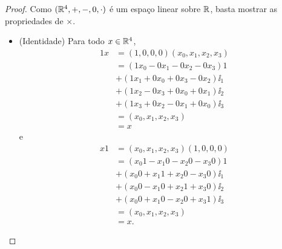 \begin{proof}
Como $(\mathbb{R}^4,+,-,0,\cdot)$ é um espaço linear sobre $\mathbb{R}$, basta mostrar as propriedades de $\times$.
\begin{itemize}
	\item (Identidade) Para todo $x \in \mathbb{R}^4$,
		\begin{align*}
		1x &= (1,0,0,0)(x_0,x_1,x_2,x_3) \\
			&= (1 x_0 - 0 x_1 - 0 x_2 - 0 x_3)1 \\
			&+ (1 x_1 + 0 x_0 + 0 x_3 - 0 x_2)\ii_1 \\
			&+ (1 x_2 - 0 x_3 + 0 x_0 + 0 x_1)\ii_2 \\
			&+ (1 x_3 + 0 x_2 - 0 x_1 + 0 x_0)\ii_3 \\
			&= (x_0,x_1,x_2,x_3) \\
			&= x
		\end{align*}
	e
		\begin{align*}
		x1 &= (x_0,x_1,x_2,x_3)(1,0,0,0) \\
			&= (x_0 1 - x_1 0 - x_2 0 - x_3 0)1 \\
			&+ (x_0 0 + x_1 1 + x_2 0 - x_3 0)\ii_1 \\
			&+ (x_0 0 - x_1 0 + x_2 1 + x_3 0)\ii_2 \\
			&+ (x_0 0 + x_1 0 - x_2 0 + x_3 1)\ii_3 \\
			&= (x_0,x_1,x_2,x_3) \\
			&= x.
		\end{align*}


\end{itemize}
\end{proof}
